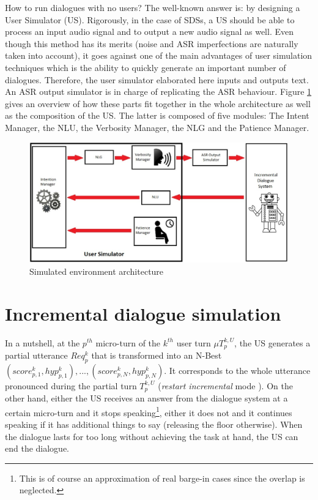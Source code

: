 	How to run dialogues with no users? The well-known answer is: by designing a User Simulator (US). Rigorously, in the case of SDSs, a US should be able to process an input audio signal and to output a new audio signal as well. Even though this method has its merits (noise and ASR imperfections are naturally taken into account), it goes against one of the main advantages of user simulation techniques which is the ability to quickly generate an important number of dialogues. Therefore, the user simulator elaborated here inputs and outputs text. An ASR output simulator is in charge of replicating the ASR behaviour. Figure \ref{fig:simuoverview} gives an overview of how these parts fit together in the whole architecture as well as the composition of the US. The latter is composed of five modules: The Intent Manager, the NLU, the Verbosity Manager, the NLG and the Patience Manager.
	
		\begin{figure}[htb]
			\centering
			\includegraphics[scale=0.45]{figures/SimuSys.jpg}
			\caption{Simulated environment architecture}
			\label{fig:simuoverview}
		\end{figure}
    
\section{Incremental dialogue simulation}
				
				In a nutshell, at the $p^{th}$ micro-turn of the $k^{th}$ user turn $\mu T^{k,U}_p$, the US generates a partial utterance $Req^k_p$ that is transformed into an N-Best ${(score^k_{p,1}, hyp^k_{p,1}),...,(score^k_{p,N}, hyp^k_{p,N})}$. It corresponds to the whole utterance pronounced during the partial turn $T^{k,U}_p$ (\textit{restart incremental} mode \cite{Schlangen2011}). On the other hand, either the US receives an answer from the dialogue system at a certain micro-turn and it stops speaking\footnote{This is of course an approximation of real barge-in cases since the overlap is neglected.}, either it does not and it continues speaking if it has additional things to say (releasing the floor otherwise). When the dialogue lasts for too long without achieving the task at hand, the US can end the dialogue.

